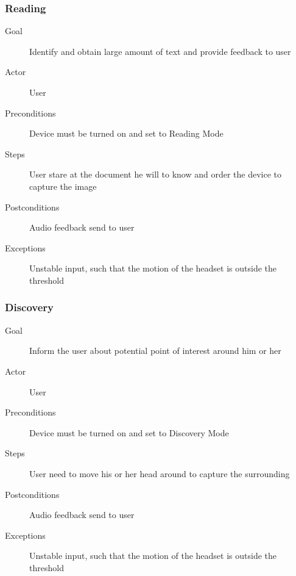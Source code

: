 \subsubsection{Reading}
\begin{description}
\item [Goal] Identify and obtain large amount of text and provide feedback to user
\item [Actor] User
\item [Preconditions] Device must be turned on and set to Reading Mode
\item [Steps] User stare at the document he will to know and order the device to capture the image
\item [Postconditions] Audio feedback send to user
\item [Exceptions] Unstable input, such that the motion of the headset is outside the threshold
\end{description}


\vspace{5mm}


\subsubsection{Discovery}
\begin{description}
\item [Goal] Inform the user about potential point of interest around him or her
\item [Actor] User
\item [Preconditions] Device must be turned on and set to Discovery Mode
\item [Steps] User need to move his or her head around to capture the surrounding
\item [Postconditions] Audio feedback send to user
\item [Exceptions] Unstable input, such that the motion of the headset is outside the threshold
\end{description}